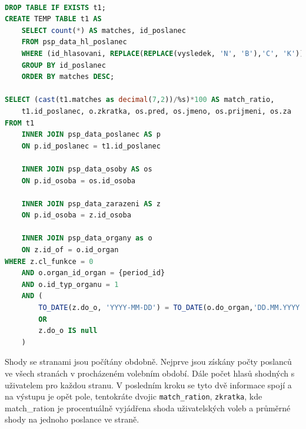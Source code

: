 \begin{lstlisting}[language=SQL, caption={SQL dotaz na vyhledání shod uživatele s poslanci}, label=code:sql-shoda-poslanci]

DROP TABLE IF EXISTS t1;
CREATE TEMP TABLE t1 AS   
    SELECT count(*) AS matches, id_poslanec 
    FROM psp_data_hl_poslanec
    WHERE (id_hlasovani, REPLACE(REPLACE(vysledek, 'N', 'B'),'C', 'K')) IN %s
    GROUP BY id_poslanec 
    ORDER BY matches DESC;
    
SELECT (cast(t1.matches as decimal(7,2))/%s)*100 AS match_ratio, 
    t1.id_poslanec, o.zkratka, os.pred, os.jmeno, os.prijmeni, os.za
FROM t1
    INNER JOIN psp_data_poslanec AS p
    ON p.id_poslanec = t1.id_poslanec

    INNER JOIN psp_data_osoby AS os
    ON p.id_osoba = os.id_osoba

    INNER JOIN psp_data_zarazeni AS z 
    ON p.id_osoba = z.id_osoba

    INNER JOIN psp_data_organy as o
    ON z.id_of = o.id_organ
WHERE z.cl_funkce = 0
    AND o.organ_id_organ = {period_id}
    AND o.id_typ_organu = 1
    AND (
        TO_DATE(z.do_o, 'YYYY-MM-DD') = TO_DATE(o.do_organ,'DD.MM.YYYY')
        OR 
        z.do_o IS null
    )
\end{lstlisting}

\par Shody se stranami jsou počítány obdobně. Nejprve jsou získány počty poslanců ve všech stranách v procházeném volebním období. Dále počet hlasů shodných s uživatelem pro každou stranu. V posledním kroku se tyto dvě informace spojí a na výstupu je opět pole, tentokráte dvojic \texttt{match\_ration}, \texttt{zkratka}, kde match\_ration je procentuálně vyjádřena shoda uživatelských voleb a průměrné shody na jednoho poslance ve straně.


